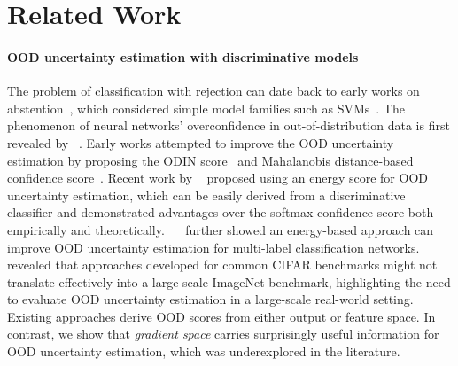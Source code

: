 \documentclass{article}
\begin{document}
\vspace{-0.1cm}
\section{Related Work}
\label{sec:related_work}
\vspace{-0.3cm}




\paragraph{OOD uncertainty estimation with discriminative models}  The problem of classification with rejection can date back to early works on abstention~\cite{chow1970optimum, fumera2002support}, which considered simple model families such as SVMs~\cite{cortes1995support}.
The phenomenon of neural networks' overconfidence in out-of-distribution data is first revealed by \citeauthor{nguyen2015deep}~\cite{nguyen2015deep}.
Early works attempted to improve the OOD uncertainty estimation by proposing the ODIN score~\citep{hsu2020generalized, liang2018enhancing} and Mahalanobis
distance-based confidence score~\citep{lee2018simple}.
Recent work by \citeauthor{liu2020energy}~\citep{liu2020energy} proposed using an energy score for OOD uncertainty estimation, which can be easily derived from a discriminative classifier and demonstrated advantages over the softmax confidence score both empirically and theoretically. ~\citeauthor{wang2021canmulti}~\cite{wang2021canmulti} further showed an energy-based approach  can improve OOD uncertainty estimation for multi-label classification networks. \citeauthor{huang2021mos}~\cite{huang2021mos} revealed that approaches developed for common CIFAR benchmarks might not translate effectively into a large-scale ImageNet benchmark, highlighting the need to evaluate OOD uncertainty estimation in a large-scale real-world setting.  Existing approaches derive OOD scores from either output or feature space. In contrast, we show that \emph{gradient space} carries surprisingly useful information for OOD uncertainty estimation, which was underexplored in the literature.







 
 


\vspace{-0.2cm}
\end{document}

